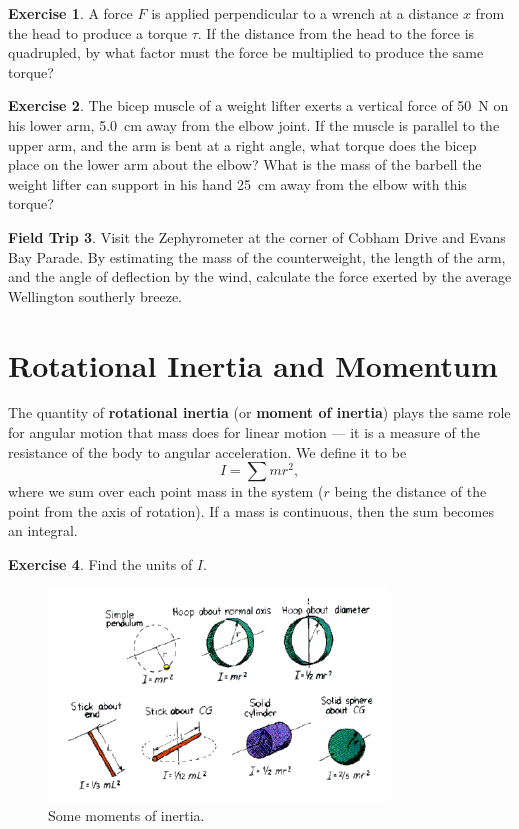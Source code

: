 \documentclass[a4paper]{amsbook}
\theoremstyle{definition}
\newtheorem{exercise}{Exercise}
\numberwithin{exercise}{chapter}
\numberwithin{exercise}{chapter}
\newtheorem{trip}[exercise]{Field Trip}
\begin{document}
\begin{exercise}
  A force $ F $ is applied perpendicular to a wrench at a distance $ x $ from the head to produce a torque $ \tau $.
  If the distance from the head to the force is quadrupled, by what factor must the force be multiplied to produce the
  same torque?
\end{exercise}

\begin{exercise}
  The bicep muscle of a weight lifter exerts a vertical force of \SI{50}{\newton} on his lower arm, \SI{5.0}{\centi\metre} away from
  the elbow joint. If the muscle is parallel to the upper arm, and the arm is bent at a right angle, what torque does the bicep place
  on the lower arm about the elbow? What is the mass of the barbell the weight lifter can support in his hand \SI{25}{\centi\metre}
  away from the elbow with this torque?
\end{exercise}

\begin{trip}
  Visit the Zephyrometer at the corner of Cobham Drive and Evans Bay Parade. By estimating the mass of the counterweight, the length of
  the arm, and the angle of deflection by the wind, calculate the force exerted by the average Wellington southerly breeze.
\end{trip}

\section{Rotational Inertia and Momentum}
The quantity of \textbf{rotational inertia} (or \textbf{moment of inertia}) plays the same role for angular motion that mass does for
linear motion --- it is a measure of the resistance of the body to angular acceleration. We define it to be
\begin{equation}
  I = \sum mr^2,
\end{equation}
where we sum over each point mass in the system ($ r $ being the distance of the point from the axis of rotation). If
a mass is continuous, then the sum becomes an integral.

\begin{exercise}
  Find the units of $ I $.
\end{exercise}

\begin{figure}
  \centering
  \includegraphics[width=0.8\textwidth]{inertiamoments}
  \caption{Some moments of inertia.\label{fig:inertias}}
\end{figure}
\end{document}

